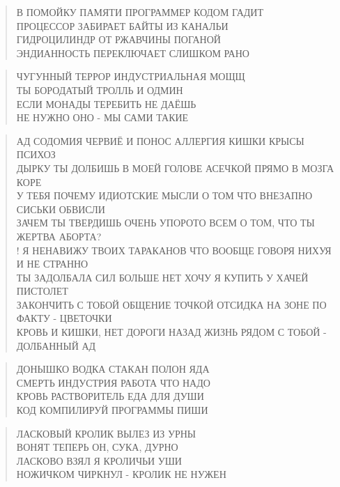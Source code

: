 \poemtitle{***}
\begin{verse}
В ПОМОЙКУ ПАМЯТИ ПРОГРАММЕР КОДОМ ГАДИТ\\
ПРОЦЕССОР ЗАБИРАЕТ БАЙТЫ ИЗ КАНАЛЬИ\\
ГИДРОЦИЛИНДР ОТ РЖАВЧИНЫ ПОГАНОЙ\\
ЭНДИАННОСТЬ ПЕРЕКЛЮЧАЕТ СЛИШКОМ РАНО
\end{verse}

\poemtitle{***}
\begin{verse}
ЧУГУННЫЙ ТЕРРОР ИНДУСТРИАЛЬНАЯ МОЩЩ\\
ТЫ БОРОДАТЫЙ ТРОЛЛЬ И ОДМИН\\
ЕСЛИ МОНАДЫ ТЕРЕБИТЬ НЕ ДАЁШЬ\\
НЕ НУЖНО ОНО - МЫ САМИ ТАКИЕ
\end{verse}

\poemtitle{***}
\begin{verse}
АД СОДОМИЯ ЧЕРВИЁ И ПОНОС АЛЛЕРГИЯ КИШКИ КРЫСЫ ПСИХОЗ\\
ДЫРКУ ТЫ ДОЛБИШЬ В МОЕЙ ГОЛОВЕ АСЕЧКОЙ ПРЯМО В МОЗГА КОРЕ\\
У ТЕБЯ ПОЧЕМУ ИДИОТСКИЕ МЫСЛИ О ТОМ ЧТО ВНЕЗАПНО СИСЬКИ ОБВИСЛИ\\
ЗАЧЕМ ТЫ ТВЕРДИШЬ ОЧЕНЬ УПОРОТО ВСЕМ О ТОМ, ЧТО ТЫ ЖЕРТВА АБОРТА?\\!
Я НЕНАВИЖУ ТВОИХ ТАРАКАНОВ ЧТО ВООБЩЕ ГОВОРЯ НИХУЯ И НЕ СТРАННО\\
ТЫ ЗАДОЛБАЛА СИЛ БОЛЬШЕ НЕТ ХОЧУ Я КУПИТЬ У ХАЧЕЙ ПИСТОЛЕТ\\
ЗАКОНЧИТЬ С ТОБОЙ ОБЩЕНИЕ ТОЧКОЙ ОТСИДКА НА ЗОНЕ ПО ФАКТУ - ЦВЕТОЧКИ\\
КРОВЬ И КИШКИ, НЕТ ДОРОГИ НАЗАД ЖИЗНЬ РЯДОМ С ТОБОЙ - ДОЛБАННЫЙ АД
\end{verse}

\poemtitle{***}
\begin{verse}
ДОНЫШКО ВОДКА СТАКАН ПОЛОН ЯДА\\
СМЕРТЬ ИНДУСТРИЯ РАБОТА ЧТО НАДО\\
КРОВЬ РАСТВОРИТЕЛЬ ЕДА ДЛЯ ДУШИ\\
КОД КОМПИЛИРУЙ ПРОГРАММЫ ПИШИ
\end{verse}

\poemtitle{***}
\begin{verse}
ЛАСКОВЫЙ КРОЛИК ВЫЛЕЗ ИЗ УРНЫ\\
ВОНЯТ ТЕПЕРЬ ОН, СУКА, ДУРНО\\
ЛАСКОВО ВЗЯЛ Я КРОЛИЧЬИ УШИ\\
НОЖИЧКОМ ЧИРКНУЛ - КРОЛИК НЕ НУЖЕН
\end{verse}

